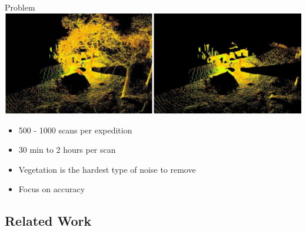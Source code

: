 \documentclass[compress]{beamer}
\begin{document}
\begin{frame}{Problem}
  \includegraphics[width=1\textwidth]{pics/cleaning.png}
  \begin{itemize}
  \item
  500 - 1000 scans per expedition
  \item
  30 min to 2 hours per scan
  \item
  Vegetation is the hardest type of noise to remove
  \item
  Focus on accuracy
  \end{itemize}
\end{frame}

\subsection{Related Work}
\end{document}
